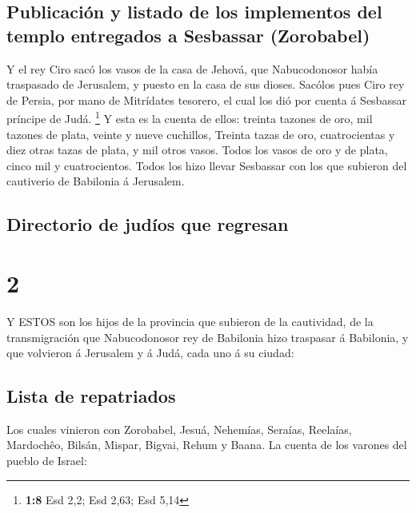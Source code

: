 \hypertarget{publicaciuxf3n-y-listado-de-los-implementos-del-templo-entregados-a-sesbassar-zorobabel}{%
\subsection{Publicación y listado de los implementos del templo
entregados a Sesbassar
(Zorobabel)}\label{publicaciuxf3n-y-listado-de-los-implementos-del-templo-entregados-a-sesbassar-zorobabel}}

 Y el rey Ciro sacó los vasos de la casa de Jehová, que
Nabucodonosor había traspasado de Jerusalem, y puesto en la casa de sus
dioses.  Sacólos pues Ciro rey de Persia, por mano de
Mitrídates tesorero, el cual los dió por cuenta á Sesbassar príncipe de
Judá. \footnote{\textbf{1:8} Esd 2,2; Esd 2,63; Esd 5,14}  Y
esta es la cuenta de ellos: treinta tazones de oro, mil tazones de
plata, veinte y nueve cuchillos,  Treinta tazas de oro,
cuatrocientas y diez otras tazas de plata, y mil otros vasos.
 Todos los vasos de oro y de plata, cinco mil y
cuatrocientos. Todos los hizo llevar Sesbassar con los que subieron del
cautiverio de Babilonia á Jerusalem.

\hypertarget{directorio-de-juduxedos-que-regresan}{%
\subsection{Directorio de judíos que
regresan}\label{directorio-de-juduxedos-que-regresan}}

\hypertarget{section-1}{%
\section{2}\label{section-1}}

 Y ESTOS son los hijos de la provincia que subieron de la
cautividad, de la transmigración que Nabucodonosor rey de Babilonia hizo
traspasar á Babilonia, y que volvieron á Jerusalem y á Judá, cada uno á
su ciudad:

\hypertarget{lista-de-repatriados}{%
\subsection{Lista de repatriados}\label{lista-de-repatriados}}

 Los cuales vinieron con Zorobabel, Jesuá, Nehemías,
Seraías, Reelaías, Mardochêo, Bilsán, Mispar, Bigvai, Rehum y Baana. La
cuenta de los varones del pueblo de Israel:

